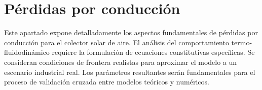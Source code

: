 \section{Pérdidas por conducción}
\label{sec:cap06_conduccion}

Este apartado expone detalladamente los aspectos fundamentales de pérdidas por conducción para el colector solar de aire.
El análisis del comportamiento termo-fluidodinámico requiere la formulación de ecuaciones constitutivas específicas.
Se consideran condiciones de frontera realistas para aproximar el modelo a un escenario industrial real.
Los parámetros resultantes serán fundamentales para el proceso de validación cruzada entre modelos teóricos y numéricos.
